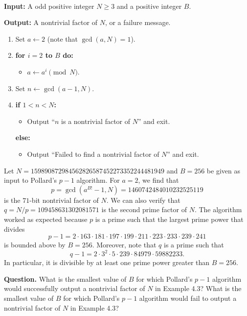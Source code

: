\begin{algo}~

    {\bf Input:} A odd positive integer $N \geq 3$ and a positive integer $B$. 
    
    {\bf Output:} A nontrivial factor of $N$, or a failure message. 
    \begin{enumerate}
        \item Set $a \gets 2$ (note that $\gcd(a, N) = 1$). 
        \item {\bf for $i = 2$ to $B$ do:}
        \begin{itemize}
            \item $a \gets a^i \pmod N$. 
        \end{itemize}
        \item Set $n \gets \gcd(a - 1, N)$.
        \item {\bf if $1 < n < N$:}
        \begin{itemize}
            \item Output ``$n$ is a nontrivial factor of $N$'' and exit. 
        \end{itemize}
        {\bf else:}
        \begin{itemize}
            \item Output ``Failed to find a nontrivial factor of $N$'' and exit.
        \end{itemize}
    \end{enumerate}
\end{algo}

\begin{exmp}
    Let $N = 159890872984562826587452273352244481949$ and $B = 256$ be given 
    as input to Pollard's $p-1$ algorithm. For $a = 2$, we find that 
    \[ p = \gcd(a^{B!} - 1, N) = 1460742484010232525119 \] 
    is the $71$-bit nontrivial factor of $N$. We can also verify that 
    $q = N/p = 109458631302081571$ is the second prime factor of $N$. The 
    algorithm worked as expected because $p$ is a prime such that the 
    largest prime power that divides 
    \[ p - 1 = 2 \cdot 163 \cdot 181 \cdot 197 \cdot 199 \cdot 211 \cdot 223 
    \cdot 233 \cdot 239 \cdot 241 \] 
    is bounded above by $B = 256$. Moreover, note that $q$ is a prime such that 
    \[ q - 1 = 2 \cdot 3^2 \cdot 5 \cdot 239 \cdot 84979 \cdot 59882233. \] 
    In particular, it is divisible by at least one prime power greater than 
    $B = 256$.  
\end{exmp}

{\bf Question.} What is the smallest value of $B$ for which Pollard's $p-1$ 
algorithm would successfully output a nontrivial factor of $N$ in Example 4.3?
What is the smallest value of $B$ for which Pollard's $p-1$ 
algorithm would fail to output a nontrivial factor of $N$ in Example 4.3? 

